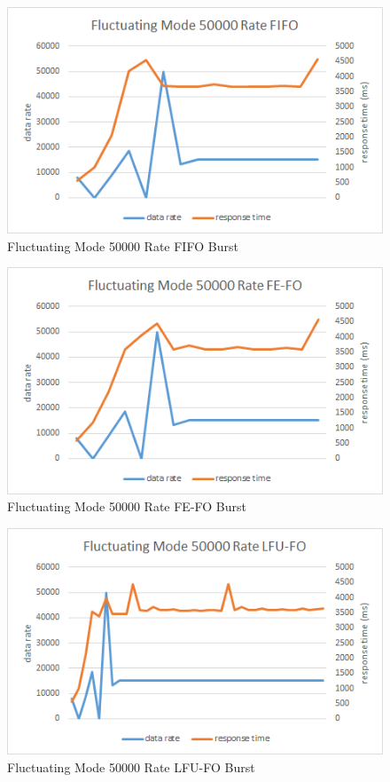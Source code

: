 \begin{figure}[!htbp]
	\centering
	\includegraphics[width=\textwidth]{img/app3-f-50000-fifo.png}
	\caption{Fluctuating Mode 50000 Rate FIFO Burst}
\end{figure}
\begin{figure}[!htbp]
	\centering
	\includegraphics[width=\textwidth]{img/app3-f-50000-fefo.png}
	\caption{Fluctuating Mode 50000 Rate FE-FO Burst}
\end{figure}
\begin{figure}[!htbp]
	\centering
	\includegraphics[width=\textwidth]{img/app3-f-50000-lfufo.png}
	\caption{Fluctuating Mode 50000 Rate LFU-FO Burst}
\end{figure}
